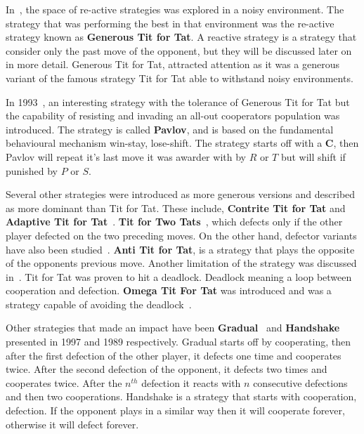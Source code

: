 \documentclass{article}
\begin{document}
In~\cite{Nowak1990}, the space of re-active strategies was explored in a noisy
environment. The strategy that was performing the best in that environment was
the re-active strategy known as \textbf{Generous Tit for Tat}. A reactive 
strategy is a strategy that consider only the past move of the opponent, but 
they will be discussed later on in more detail. Generous Tit for Tat, attracted
attention as it was a generous variant of the famous strategy Tit for Tat able
to withstand noisy environments.

In 1993~\cite{Nowak1993}, an interesting strategy with the 
tolerance of Generous Tit for Tat but the capability of resisting and invading
an all-out cooperators population was introduced. The strategy is called \textbf{Pavlov},
and is based on the fundamental behavioural mechanism win-stay, lose-shift.
The strategy starts off with a \textbf{C}, then Pavlov will repeat it's last
move it was awarder with by \(R\) or \(T\) but will shift if punished by \(P\) or
\(S\).

Several other strategies were introduced as more generous versions and 
described as more dominant than Tit for Tat. These include, \textbf{Contrite Tit for Tat}
\cite{Wu1995} and \textbf{Adaptive Tit for Tat}~\cite{tzafestas-2000a}.
\textbf{Tit for Two Tats}~\cite{axelrod1988}, which defects only if the other
player defected on the two preceding moves. On the
other hand, defector variants have also been studied~\cite{Hilde2013}.
\textbf{Anti Tit for Tat}, is a strategy that plays the opposite of the opponents
previous move. Another limitation of the strategy was discussed in~\cite{Wolfgang2006}.
Tit for Tat was proven to hit a deadlock. Deadlock meaning a loop between 
cooperation and defection. \textbf{Omega Tit For Tat} was introduced and was
a strategy capable of avoiding the deadlock~\cite{Wolfgang2006}.

Other strategies that made an impact have been \textbf{Gradual}~\cite{Beaufils1997}
and \textbf{Handshake}~\cite{Robson1989} presented in 1997 and 1989 respectively.
Gradual starts off by cooperating, then after the first defection of the other player, 
it defects one time and cooperates twice. After the second defection of the opponent,
it defects two times and cooperates twice. After the \(n^{th}\) defection it reacts with 
\(n\) consecutive defections and then two cooperations. 
Handshake is a strategy that starts with cooperation, defection. If the opponent plays in
a similar way then it will cooperate forever, otherwise it will defect forever.
\end{document}
